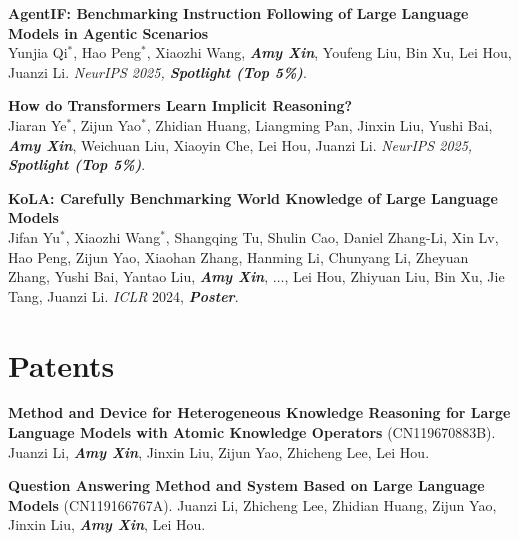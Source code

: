 \documentclass[letterpaper,11pt,UTF8]{article}
\newcommand{\highlight}[1]{\textcolor[RGB]{150,0,0}{\textbf{\textit{#1}}}}
\newcommand{\myauthor}[1]{\textcolor[RGB]{100,0,0}{\textbf{\textit{#1}}}}
\begin{document}
\begin{enumerate}[resume,topsep=0pt,leftmargin=18pt,label={[\arabic*]}]
    \item \textbf{AgentIF: Benchmarking Instruction Following of Large Language Models in Agentic Scenarios} \\ Yunjia Qi$^*$, Hao Peng$^*$, Xiaozhi Wang, \myauthor{Amy Xin}, Youfeng Liu, Bin Xu, Lei Hou, Juanzi Li. \textit{NeurIPS 2025, \highlight{Spotlight (Top 5\%)}}.
    \item \textbf{How do Transformers Learn Implicit Reasoning?} \\ Jiaran Ye$^*$, Zijun Yao$^*$, Zhidian Huang, Liangming Pan, Jinxin Liu, Yushi Bai, \myauthor{Amy Xin}, Weichuan Liu, Xiaoyin Che, Lei Hou, Juanzi Li. \textit{NeurIPS 2025, \highlight{Spotlight (Top 5\%)}}.
    \item \textbf{KoLA: Carefully Benchmarking World Knowledge of Large Language Models} \\
    Jifan Yu$^*$, Xiaozhi Wang$^*$, Shangqing Tu, Shulin Cao, Daniel Zhang-Li, Xin Lv, Hao Peng, Zijun Yao, Xiaohan Zhang, Hanming Li, Chunyang Li, Zheyuan Zhang, Yushi Bai, Yantao Liu, \myauthor{Amy Xin}, $\dots$, Lei Hou, Zhiyuan Liu, Bin Xu, Jie Tang, Juanzi Li. \textit{ICLR} 2024, \textbf{\textit{Poster}}.
\end{enumerate}


\vspace{0.005in}


\section{Patents}

\begin{enumerate}[topsep=0pt,leftmargin=18pt,label={[\arabic*]}]
    \item \textbf{Method and Device for Heterogeneous Knowledge Reasoning for Large Language Models with Atomic Knowledge Operators} (CN119670883B). Juanzi Li, \highlight{Amy Xin}, Jinxin Liu, Zijun Yao, Zhicheng Lee, Lei Hou.
    \item \textbf{Question Answering Method and System Based on Large Language Models} (CN119166767A). Juanzi Li, Zhicheng Lee, Zhidian Huang, Zijun Yao, Jinxin Liu, \highlight{Amy Xin}, Lei Hou.
\end{enumerate}
\end{document}
